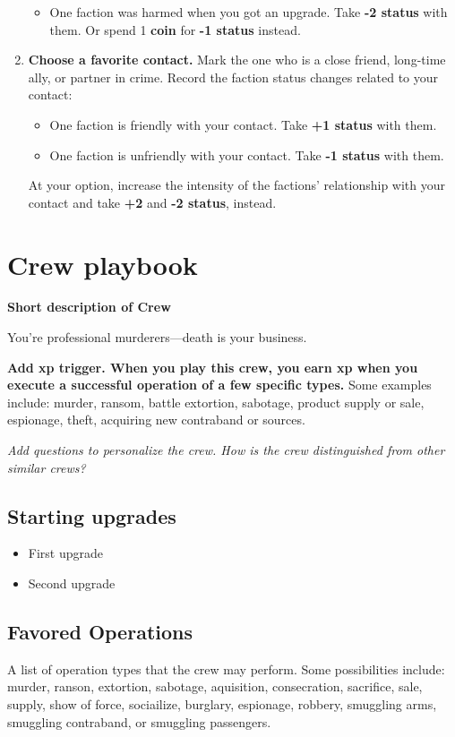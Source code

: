 \documentclass[11pt,oneside]{book}
\newcommand{\gameterm}[1]{\textbf{#1}}
\begin{document}
\begin{enumerate}
\begin{itemize}
		\item One faction was harmed when you got an upgrade. Take \textbf{-2 status} with them. Or spend 1 \gameterm{coin}  for \textbf{-1 status} instead.
		\end{itemize}
	\item \textbf{Choose a favorite contact.} Mark the one who is a close friend, long-time ally, or partner in crime. Record the faction status changes related to your contact:
		\begin{itemize}
		\item One faction is friendly with your contact. Take \textbf{+1 status} with them.
		\item One faction is unfriendly with your contact. Take \textbf{-1 status} with them.
		\end{itemize}
		At your option, increase the intensity of the factions’ relationship with your contact and take \textbf{+2} and \textbf{-2 status}, instead.
\end{enumerate}

\chapter{Crew playbook}

\textbf{Short description of Crew}

You’re professional murderers---death is your business.

\textbf{Add xp trigger. When you play this crew, you earn xp when you execute a successful operation of a few specific types.} Some examples include: murder, ransom, battle extortion, sabotage, product supply or sale, espionage, theft, acquiring new contraband or sources.

\emph{Add questions to personalize the crew. How is the crew distinguished from other similar crews?}

\section{Starting upgrades}
\begin{itemize}
	\item First upgrade
	\item Second upgrade
\end{itemize}

\section{Favored Operations}
A list of operation types that the crew may perform. Some possibilities include: murder, ranson, extortion, sabotage, aquisition, consecration, sacrifice, sale, supply, show of force, sociailize, burglary, espionage, robbery, smuggling arms, smuggling contraband, or smuggling passengers.
\end{document}
